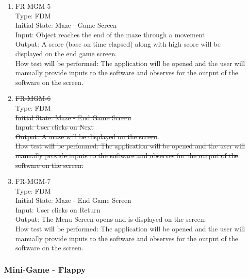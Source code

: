 \documentclass[12pt, titlepage]{article}
\begin{document}
\begin{enumerate}
\item{FR-MGM-5\\}
Type: FDM\\
Initial State: Maze - Game Screen\\
Input: Object reaches the end of the maze through a movement\\
Output: A score (base on time elapsed) along with high score will be displayed on the end game screen.\\
How test will be performed: The application will be opened and the user will manually provide inputs to the software and observes for the output of the software on the screen.\\

\item{\sout{FR-MGM-6}\\}
\sout{Type: FDM}\\
\sout{Initial State: Maze - End Game Screen}\\
\sout{Input: User clicks on Next}\\
\sout{Output: A maze will be displayed on the screen}.\\
\sout{How test will be performed: The application will be opened and the user will manually provide inputs to the software and observes for the output of the software on the screen.}\\

\item{FR-MGM-7\\}
Type: FDM\\
Initial State: Maze - End Game Screen\\
Input: User clicks on Return\\
Output: The Menu Screen opens and is displayed on the screen.\\
How test will be performed: The application will be opened and the user will manually provide inputs to the software and observes for the output of the software on the screen.\\
    
\end{enumerate}

\subsubsection{Mini-Game - Flappy}
\end{document}
